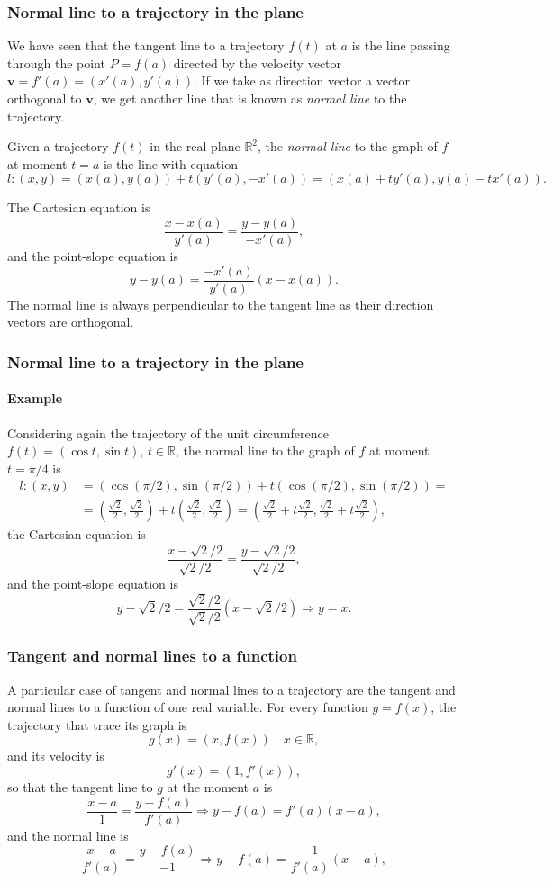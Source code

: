 \begin{frame}
\frametitle{Normal line to a trajectory in the plane}
We have seen that the tangent line to a trajectory $f(t)$ at $a$ is the line passing through the point 
$P=f(a)$ directed by the velocity vector $\mathbf{v}=f'(a)=(x'(a),y'(a))$. 
If we take as direction vector a vector orthogonal to $\mathbf{v}$, we get another line that is known as \emph{normal line} to the trajectory.
\begin{definition}
Given a trajectory $f(t)$ in the real plane $\mathbb{R}^2$, the \emph{normal line} to the graph of $f$ at moment $t=a$ is the line with equation
\[
l: (x,y)=(x(a),y(a))+t(y'(a),-x'(a)) = (x(a)+ty'(a),y(a)-tx'(a)).
\]
\end{definition}
The Cartesian equation is 
\[
\frac{x-x(a)}{y'(a)} = \frac{y-y(a)}{-x'(a)},
\]
and the point-slope equation is
\[
y-y(a) = \frac{-x'(a)}{y'(a)}(x-x(a)).
\]
The normal line is always perpendicular to the tangent line as their direction vectors are orthogonal. 
\end{frame}


\begin{frame}
\frametitle{Normal line to a trajectory in the plane}
\framesubtitle{Example}
Considering again the trajectory of the unit circumference $f(t) = (\cos t,\sin t)$, $t\in \mathbb{R}$, the normal line to the graph of $f$ at moment $t=\pi/4$ is
\begin{align*}
l: (x,y)&=(\cos(\pi/2),\sin(\pi/2))+t(\cos(\pi/2),\sin(\pi/2)) =\\
&= \left(\frac{\sqrt{2}}{2},\frac{\sqrt{2}}{2}\right)+t\left(\frac{\sqrt{2}}{2},\frac{\sqrt{2}}{2}\right)
=\left(\frac{\sqrt{2}}{2}+t\frac{\sqrt{2}}{2},\frac{\sqrt{2}}{2}+t\frac{\sqrt{2}}{2}\right),
\end{align*}
the Cartesian equation is 
\[
\frac{x-\sqrt{2}/2}{\sqrt{2}/2} = \frac{y-\sqrt{2}/2}{\sqrt{2}/2},
\]
and the point-slope equation is 
\[
y-\sqrt{2}/2 = \frac{\sqrt{2}/2}{\sqrt{2}/2}(x-\sqrt{2}/2) \Rightarrow y=x.
\]
\end{frame}


\begin{frame}
\frametitle{Tangent and normal lines to a function}
A particular case of tangent and normal lines to a trajectory are the tangent and normal lines to a function of one real variable. 
For every function $y=f(x)$, the trajectory that trace its graph is
\[
g(x) = (x,f(x))  \quad x\in \mathbb{R},
\]
and its velocity is 
\[
g'(x) = (1,f'(x)),
\]
so that the tangent line to $g$ at the moment $a$ is
\[
\frac{x-a}{1} = \frac{y-f(a)}{f'(a)} \Rightarrow y-f(a) = f'(a)(x-a),
\]
and the normal line is 
\[
\frac{x-a}{f'(a)} = \frac{y-f(a)}{-1} \Rightarrow y-f(a) = \frac{-1}{f'(a)}(x-a),
\]
\end{frame}



